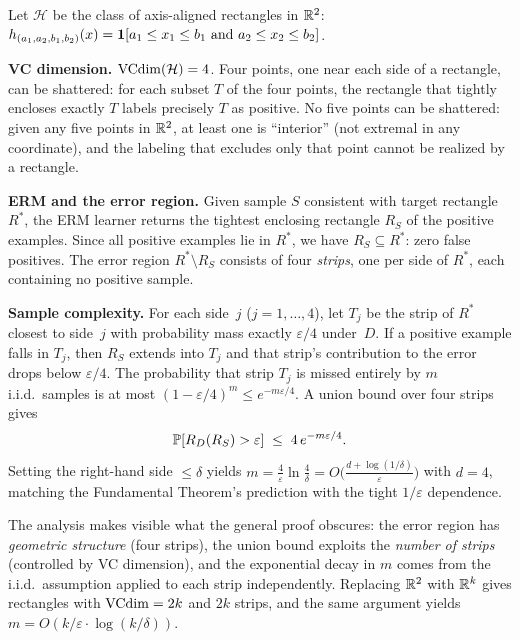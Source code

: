 \begin{example}
\label{ex:pac-rectangles}
Let $\mathcal{H}$ be the class of axis-aligned rectangles in $\mathbb{R}^2$:
$h_{(a_1,a_2,b_1,b_2)}(x) = \mathbf{1}[a_1 \leq x_1 \leq b_1 \text{ and }
a_2 \leq x_2 \leq b_2]$.

\medskip
\noindent\textbf{VC dimension.}  $\mathrm{VCdim}(\mathcal{H}) = 4$.  Four points,
one near each side of a rectangle, can be shattered: for each subset
$T$ of the four points, the rectangle that tightly encloses exactly
$T$ labels precisely $T$ as positive.  No five points can be shattered:
given any five points in $\mathbb{R}^2$, at least one is ``interior'' (not
extremal in any coordinate), and the labeling that excludes only
that point cannot be realized by a rectangle.

\medskip
\noindent\textbf{ERM and the error region.}  Given sample $S$
consistent with target rectangle $R^*$, the ERM learner returns the
tightest enclosing rectangle $R_S$ of the positive examples.  Since
all positive examples lie in $R^*$, we have $R_S \subseteq R^*$:
zero false positives.  The error region $R^* \setminus R_S$ consists
of four \emph{strips}, one per side of $R^*$, each containing no
positive sample.

\medskip
\noindent\textbf{Sample complexity.}  For each side~$j$ ($j = 1,
\ldots, 4$), let $T_j$ be the strip of $R^*$ closest to side~$j$ with
probability mass exactly $\varepsilon/4$ under~$D$.  If a positive
example falls in $T_j$, then $R_S$ extends into $T_j$ and that
strip's contribution to the error drops below $\varepsilon/4$.  The
probability that strip $T_j$ is missed entirely by $m$ i.i.d.\ samples
is at most $(1 - \varepsilon/4)^m \leq e^{-m\varepsilon/4}$.  A union
bound over four strips gives
\[
  \mathbb{P}[R_D(R_S) > \varepsilon]
  \;\leq\; 4\, e^{-m\varepsilon/4}.
\]
Setting the right-hand side $\leq \delta$ yields
$m = \frac{4}{\varepsilon}\ln\frac{4}{\delta}
= O\!\bigl(\frac{d + \log(1/\delta)}{\varepsilon}\bigr)$
with $d = 4$, matching the Fundamental Theorem's prediction with the
tight $1/\varepsilon$ dependence.

The analysis makes visible what the general proof obscures: the error
region has \emph{geometric structure} (four strips), the union bound
exploits the \emph{number of strips} (controlled by VC dimension),
and the exponential decay in $m$ comes from the i.i.d.\ assumption
applied to each strip independently.  Replacing $\mathbb{R}^2$ with $\mathbb{R}^k$
gives rectangles with $\mathrm{VCdim} = 2k$ and $2k$ strips, and the same
argument yields $m = O(k/\varepsilon \cdot \log(k/\delta))$.
\end{example}

